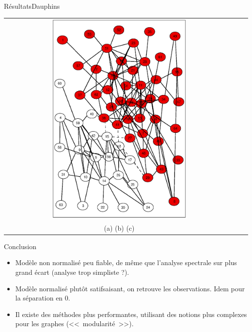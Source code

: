 \documentclass{beamer}
\begin{document}
\begin{frame}{Résultats}{Dauphins}
	\begin{center}
		\begin{tabular}[h]{ccc}
		\includegraphics[width=0.6\textwidth]{do-m2-2}
		\vspace{-1cm}
		\\
		(a) (b) (c)
		\end{tabular}
	\end{center}
\end{frame}

\begin{frame}{Conclusion}
	\begin{itemize}
		\item Modèle non normalisé peu fiable, de même que l'analyse spectrale sur plus grand écart (analyse trop simpliste ?).
		\item Modèle normalisé plutôt satifsaisant, on retrouve les observations. Idem pour la séparation en 0.
		\item Il existe des méthodes plus performantes, utilisant des notions plus complexes pour les graphes (<<~modularité~>>).
	\end{itemize}
\end{frame}
\end{document}

